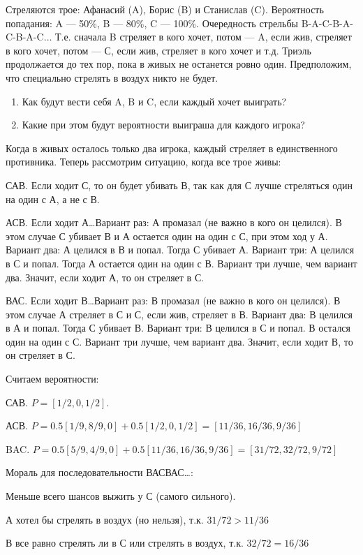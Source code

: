 \begin{problem}
Стреляются трое: Афанасий (A), Борис (B) и Станислав (C). Вероятность попадания: A --- 50\%, B --- 80\%, C --- 100\%. Очередность стрельбы B-A-C-B-A-C-B-A-C$\ldots$ Т.е. сначала B стреляет в кого хочет, потом --- A, если жив, стреляет в кого хочет, потом --- С, если жив, стреляет в кого хочет и т.д. Триэль продолжается до тех пор, пока в живых не останется ровно один. Предположим, что специально стрелять в воздух никто не будет.

\begin{enumerate}
\item Как будут вести себя A, B и C, если каждый хочет выиграть?

\item Какие при этом будут вероятности выиграша для каждого игрока?
\end{enumerate}
\begin{sol}
Когда в живых осталось только два игрока, каждый стреляет в единственного противника. Теперь рассмотрим ситуацию, когда все трое живы:

САВ. Если ходит С, то он будет убивать В, так как для С лучше стреляться один на один с А, а не с В.

АСВ. Если ходит А\ldots Вариант раз: А промазал (не важно в кого он целился). В этом случае С убивает В и А остается один на один с С, при этом ход у А.  Вариант два: А целился в В и попал. Тогда С убивает А. Вариант три: А целился в С и попал. Тогда А остается один на один с В. Вариант три лучше, чем вариант два. Значит, если ходит А, то он стреляет в С.

ВАС. Если ходит В\ldots Вариант раз: В промазал (не важно в кого он целился). В этом случае А стреляет в С и С, если жив, стреляет в В. Вариант два: В целился в А и попал. Тогда С убивает В. Вариант три: В целился в С и попал. В остался один на один с С. Вариант три лучше, чем вариант два. Значит, если ходит В, то он стреляет в С.

Считаем вероятности:

САВ. $P=[1/2,0,1/2]$.

АСВ. $P=0.5[1/9,8/9,0]+0.5[1/2,0,1/2]=[11/36,16/36,9/36]$

BAC. $P=0.5[5/9,4/9,0]+0.5[11/36,16/36,9/36]=[31/72,32/72,9/72]$

Мораль для последовательности ВАСВАС\ldots :

Меньше всего шансов выжить у С (самого сильного).

А хотел бы стрелять в воздух (но нельзя), т.к. $31/72>11/36$

В все равно стрелять ли в С или стрелять в воздух, т.к. $32/72=16/36$
\end{sol}
\end{problem}






